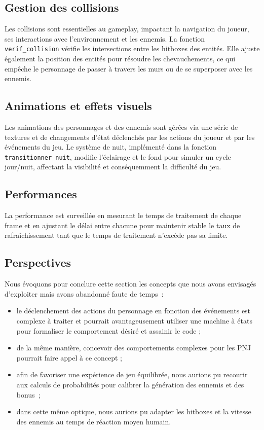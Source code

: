 \documentclass[a4paper,12pt]{article}
\begin{document}
\subsection{Gestion des collisions}

Les collisions sont essentielles au gameplay, impactant la navigation du joueur, ses interactions avec l'environnement et les ennemis. La fonction \texttt{verif\_collision} vérifie les intersections entre les hitboxes des entités. Elle ajuste également la position des entités pour résoudre les chevauchements, ce qui empêche le personnage de passer à travers les murs ou de se superposer avec les ennemis.

\subsection{Animations et effets visuels}

Les animations des personnages et des ennemis sont gérées via une série de textures et de changements d'état déclenchés par les actions du joueur et par les événements du jeu. Le système de nuit, implémenté dans la fonction \texttt{transitionner\_nuit}, modifie l'éclairage et le fond pour simuler un cycle jour/nuit, affectant la visibilité et conséquemment la difficulté du jeu.

\subsection{Performances}

La performance est surveillée en mesurant le temps de traitement de chaque frame et en ajustant le délai entre chacune pour maintenir stable le taux de rafraîchissement tant que le temps de traitement n’excède pas sa limite.

\subsection{Perspectives}

Nous évoquons pour conclure cette section les concepts que nous avons envisagés d’exploiter mais avons abandonné faute de temps :
\begin{itemize}
    \item le déclenchement des actions du personnage en fonction des événements est complexe à traiter et pourrait avantageusement utiliser une machine à états pour formaliser le comportement désiré et assainir le code ;
    \item de la même manière, concevoir des comportements complexes pour les PNJ pourrait faire appel à ce concept ;
    \item afin de favoriser une expérience de jeu équilibrée, nous aurions pu recourir aux calculs de probabilités pour calibrer la génération des ennemis et des bonus ;
    \item dans cette même optique, nous aurions pu adapter les hitboxes et la vitesse des ennemis au temps de réaction moyen humain.
\end{itemize}
\end{document}
